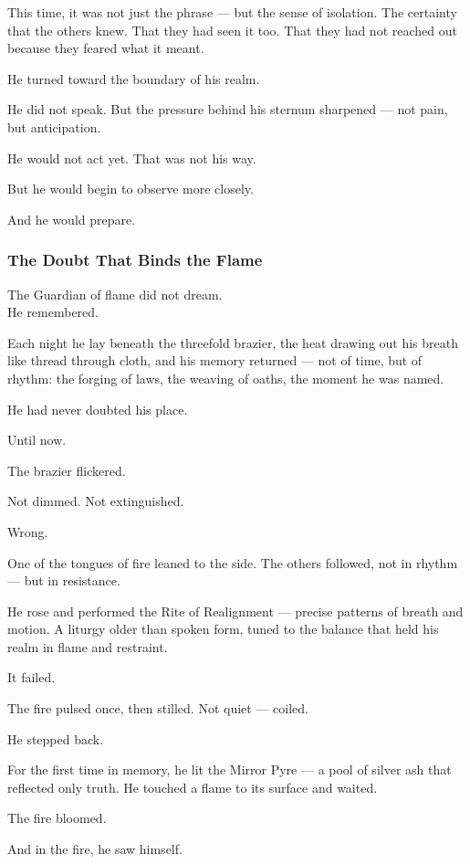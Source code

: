 \documentclass[12pt]{article}
\begin{document}
This time, it was not just the phrase — but the sense of isolation. The certainty that the others knew. That they had seen it too. That they had not reached out because they feared what it meant.

He turned toward the boundary of his realm.

He did not speak. But the pressure behind his sternum sharpened — not pain, but anticipation.

He would not act yet. That was not his way.

But he would begin to observe more closely.

And he would prepare.


\dotfill

\subsubsection{The Doubt That Binds the Flame}

The Guardian of flame did not dream.\\
He remembered.

Each night he lay beneath the threefold brazier, the heat drawing out his breath like thread through cloth, and his memory returned — not of time, but of rhythm: the forging of laws, the weaving of oaths, the moment he was named.

He had never doubted his place.

Until now.

The brazier flickered.

Not dimmed. Not extinguished.

Wrong.

One of the tongues of fire leaned to the side. The others followed, not in rhythm — but in resistance.

He rose and performed the Rite of Realignment — precise patterns of breath and motion. A liturgy older than spoken form, tuned to the balance that held his realm in flame and restraint.

It failed.

The fire pulsed once, then stilled. Not quiet — coiled.

He stepped back.

For the first time in memory, he lit the Mirror Pyre — a pool of silver ash that reflected only truth. He touched a flame to its surface and waited.

The fire bloomed.

And in the fire, he saw himself.
\end{document}

